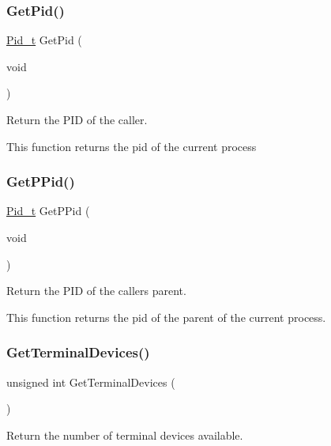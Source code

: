 \subsubsection{\texorpdfstring{Get\+Pid()}{GetPid()}}
{\footnotesize\ttfamily \hyperlink{group__syscalls_gafac07f3170763932fac97b6eab2c3984}{Pid\+\_\+t} Get\+Pid (\begin{DoxyParamCaption}\item[{void}]{ }\end{DoxyParamCaption})}



Return the P\+ID of the caller. 

This function returns the pid of the current process \mbox{\label{group__syscalls_ga33ccb3f7c80d85e610206c0e1150657b}} 
\subsubsection{\texorpdfstring{Get\+P\+Pid()}{GetPPid()}}
{\footnotesize\ttfamily \hyperlink{group__syscalls_gafac07f3170763932fac97b6eab2c3984}{Pid\+\_\+t} Get\+P\+Pid (\begin{DoxyParamCaption}\item[{void}]{ }\end{DoxyParamCaption})}



Return the P\+ID of the caller\textquotesingle{}s parent. 

This function returns the pid of the parent of the current process. \mbox{\label{group__syscalls_ga31576e1579c15b6b066038702e6557c7}} 
\subsubsection{\texorpdfstring{Get\+Terminal\+Devices()}{GetTerminalDevices()}}
{\footnotesize\ttfamily unsigned int Get\+Terminal\+Devices (\begin{DoxyParamCaption}{ }\end{DoxyParamCaption})}



Return the number of terminal devices available. 

